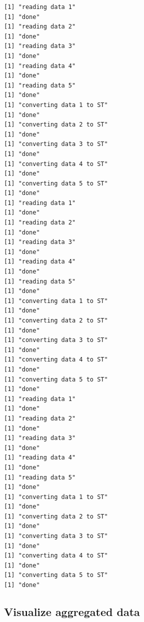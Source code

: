 \documentclass[
  letterpaper,
  DIV=11,
  numbers=noendperiod]{scrartcl}
\begin{document}
\begin{verbatim}
[1] "reading data 1"
[1] "done"
[1] "reading data 2"
[1] "done"
[1] "reading data 3"
[1] "done"
[1] "reading data 4"
[1] "done"
[1] "reading data 5"
[1] "done"
[1] "converting data 1 to ST"
[1] "done"
[1] "converting data 2 to ST"
[1] "done"
[1] "converting data 3 to ST"
[1] "done"
[1] "converting data 4 to ST"
[1] "done"
[1] "converting data 5 to ST"
[1] "done"
[1] "reading data 1"
[1] "done"
[1] "reading data 2"
[1] "done"
[1] "reading data 3"
[1] "done"
[1] "reading data 4"
[1] "done"
[1] "reading data 5"
[1] "done"
[1] "converting data 1 to ST"
[1] "done"
[1] "converting data 2 to ST"
[1] "done"
[1] "converting data 3 to ST"
[1] "done"
[1] "converting data 4 to ST"
[1] "done"
[1] "converting data 5 to ST"
[1] "done"
[1] "reading data 1"
[1] "done"
[1] "reading data 2"
[1] "done"
[1] "reading data 3"
[1] "done"
[1] "reading data 4"
[1] "done"
[1] "reading data 5"
[1] "done"
[1] "converting data 1 to ST"
[1] "done"
[1] "converting data 2 to ST"
[1] "done"
[1] "converting data 3 to ST"
[1] "done"
[1] "converting data 4 to ST"
[1] "done"
[1] "converting data 5 to ST"
[1] "done"
\end{verbatim}

\subsection{Visualize aggregated data}\label{visualize-aggregated-data}
\end{document}
